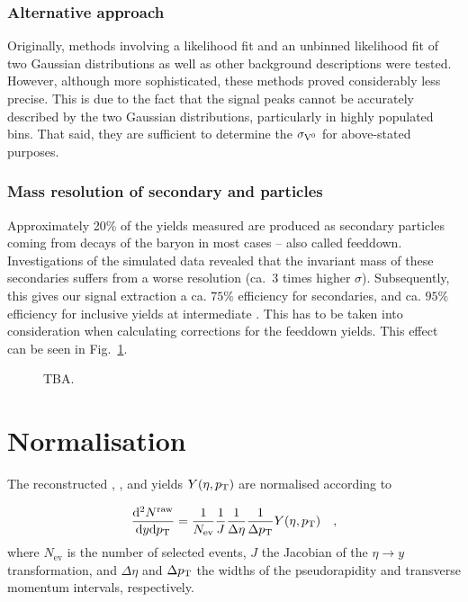 \subsubsection*{Alternative approach}
Originally, methods involving a likelihood fit and an unbinned likelihood fit of two Gaussian distributions as well as other background descriptions were tested. However, although more sophisticated, these methods proved considerably less precise. This is due to the fact that the signal peaks cannot be accurately described by the two Gaussian distributions, particularly in highly populated \pt bins. That said, they are sufficient to determine the $\sigma_{\rm V^0}$ for above-stated purposes.

\subsubsection*{Mass resolution of secondary \LA and \AL particles}
Approximately 20\% of the \LA yields measured are produced as secondary particles coming from decays of the \XI baryon in most cases -- also called feeddown. Investigations of the simulated data revealed that the invariant mass of these secondaries suffers from a worse resolution (ca.\ 3 times higher $\sigma$). Subsequently, this gives our signal extraction a ca. $75\%$ efficiency for secondaries, and ca. $95\%$ efficiency for inclusive \LA yields at intermediate \pt. This has to be taken into consideration when calculating corrections for the feeddown yields. This effect can be seen in Fig.~\ref{fig:analysis:masssecond}.

\begin{figure}%
%
%
\caption{TBA.}%
\label{fig:analysis:masssecond}%
\end{figure}

\section{Normalisation}

The reconstructed \KOs, \LA, and \AL yields $Y(\eta,p_{\text{T}})$ are normalised according to

\begin{align}
\frac{\mathrm{d}^2 N^\mathrm{raw}}{\mathrm{d}y \mathrm{d}p_{\text{T}}} = \frac{1}{N_\mathrm{ev}} \frac{1}{J} \frac{1}{\Delta \eta} \frac{1}{\Delta p_{\text{T}}} Y(\eta,p_{\text{T}}) \quad ,
\end{align}
where $N_\mathrm{ev}$ is the number of selected events, $J$ the Jacobian of the $\eta \rightarrow y$ transformation, and $\Delta \eta$ and $\Delta p_{\text{T}}$ the widths of the pseudorapidity and transverse momentum intervals, respectively.

